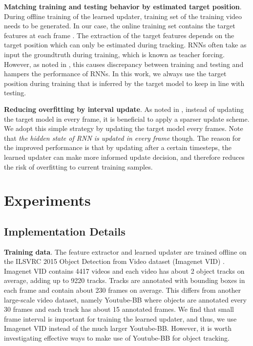 \documentclass[journal]{IEEEtran}
\begin{document}
\textbf{Matching training and testing behavior by estimated target position}. During offline training of the learned updater, training set  of the training video needs to be generated. In our case, the online training set contains the target features at each frame . The extraction of the target features depends on the target position which can only be estimated during tracking. RNNs often take as input the groundtruth during training, which is known as teacher forcing. However, as noted in \cite{bengio2015scheduled}, this causes discrepancy between training and testing and hampers the performance of RNNs. In this work, we always use the target position during training that is inferred by the target model to keep in line with testing.

\textbf{Reducing overfitting by interval update}. As noted in \cite{Danelljan2016ECOEC}, instead of updating the target model in every frame, it is beneficial to apply a sparser update scheme. We adopt this simple strategy by updating the target model every  frames. Note that \emph{the hidden state of RNN is updated in every frame} though. The reason for the improved performance is that by updating after a certain timesteps, the learned updater can make more informed update decision, and therefore reduces the risk of overfitting to current training samples.

\section{Experiments}\label{sec:experiments}
\subsection{Implementation Details}
\textbf{Training data}. The feature extractor and learned updater are trained offline on the ILSVRC 2015 Object Detection from Video dataset (Imagenet VID) \cite{russakovsky2015imagenet}. Imagenet VID contains 4417 videos and each video has about 2 object tracks on average, adding up to 9220 tracks. Tracks are annotated with bounding boxes in each frame and contain about 230 frames on average. This differs from another large-scale video dataset, namely Youtube-BB \cite{real2017youtube} where objects are annotated every 30 frames and each track has about 15 annotated frames. We find that small frame interval is important for training the learned updater, and thus, we use Imagenet VID instead of the much larger Youtube-BB. However, it is worth investigating effective ways to make use of Youtube-BB for object tracking. 
\end{document}

